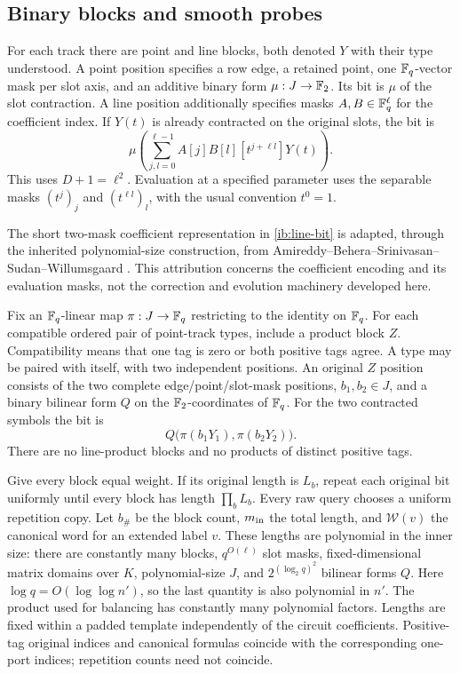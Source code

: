 \subsection{Binary blocks and smooth probes}
\label{ib:binary-blocks}

For each track there are point and line blocks, both denoted \(Y\)
with their type understood.  A point position specifies a row edge,
a retained point, one \(\mathbb{F}_q\)-vector mask per slot axis, and an
additive binary form \(\mu:J\to\mathbb{F}_2\).  Its bit is \(\mu\) of
the slot contraction.  A line position additionally specifies masks
\(A,B\in\mathbb{F}_q^\ell\) for the coefficient index.  If \(Y(t)\)
is already contracted on the original slots, the bit is
\begin{equation}
 \mu\left(\sum_{j,l=0}^{\ell-1}A[j]B[l]
                     [t^{j+\ell l}]Y(t)\right).
 \label{ib:line-bit}
\end{equation}
This uses \(D+1=\ell^2\).  Evaluation at a specified parameter
uses the separable masks \((t^j)_j\) and \((t^{\ell l})_l\),
with the usual convention \(t^0=1\).

The short two-mask coefficient representation in \eqref{ib:line-bit}
is adapted, through the inherited polynomial-size construction, from
Amireddy--Behera--Srinivasan--Sudan--Willumsgaard
\cite[Section~3.1, Definition~3.1 and Claim~3.2]{ABSsw26}.
This attribution concerns the coefficient encoding and its evaluation
masks, not the correction and evolution machinery developed here.

Fix an \(\mathbb{F}_q\)-linear map \(\pi:J\to\mathbb{F}_q\) restricting to
the identity on \(\mathbb{F}_q\).  For each compatible ordered pair of
point-track types, include a product block \(Z\).  Compatibility
means that one tag is zero or both positive tags agree.  A type may
be paired with itself, with two independent positions.  An original
\(Z\) position consists of the two complete edge/point/slot-mask
positions, \(b_1,b_2\in J\), and a binary bilinear form \(Q\)
on the \(\mathbb{F}_2\)-coordinates of \(\mathbb{F}_q\).  For the two contracted
symbols the bit is
\begin{equation}
 Q\bigl(\pi(b_1Y_1),\pi(b_2Y_2)\bigr).
 \label{ib:product-bit}
\end{equation}
There are no line-product blocks and no products of distinct
positive tags.

Give every block equal weight.  If its original length is \(L_b\),
repeat each original bit uniformly until every block has length
\(\prod_b L_b\).  Every raw query chooses a uniform repetition
copy.  Let \(b_\#\) be the block count, \(m_{\rm in}\) the total
length, and \(\mathcal W(v)\) the canonical word for an extended
label \(v\).  These lengths are polynomial in the inner size:
there are constantly many blocks, \(q^{O(\ell)}\) slot masks,
fixed-dimensional matrix domains over \(K\), polynomial-size
\(J\), and \(2^{(\log_2q)^2}\) bilinear forms \(Q\).
Here \(\log q=O(\log\log n')\), so the last quantity is also
polynomial in \(n'\).  The product used for balancing has constantly
many polynomial factors.  Lengths are fixed within a padded template
independently of the circuit coefficients.  Positive-tag original
indices and canonical formulas coincide with the corresponding
one-port indices; repetition counts need not coincide.

